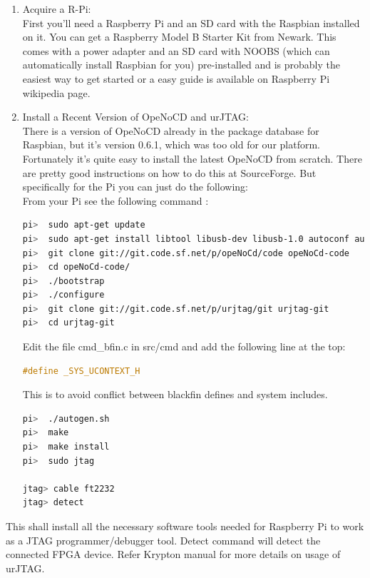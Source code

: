 \begin{enumerate}
\item{Acquire a R-Pi:}\\
First you’ll need a Raspberry Pi and an SD card with the Raspbian installed on it. You can get a Raspberry Model B Starter Kit from Newark. This comes with a power adapter and an SD card with NOOBS (which can automatically install Raspbian for you) pre-installed and is probably the easiest way to get started or a easy guide is available on Raspberry Pi wikipedia page.
\item{Install a Recent Version of OpeNoCD and urJTAG:}\\
There is a version of OpeNoCD already in the package database for Raspbian, but it’s version 0.6.1, which was too old for our platform. Fortunately it’s quite easy to install the latest OpeNoCD from scratch. There are pretty good instructions on how to do this at SourceForge. But specifically for the Pi you can just do the following:\\

\noindent From your Pi see the following command :

\begin{lstlisting}[language=bash]
pi>  sudo apt-get update
pi>  sudo apt-get install libtool libusb-dev libusb-1.0 autoconf automake texinfo
pi>  git clone git://git.code.sf.net/p/opeNoCd/code opeNoCd-code
pi>  cd opeNoCd-code/
pi>  ./bootstrap
pi>  ./configure
pi>  git clone git://git.code.sf.net/p/urjtag/git urjtag-git
pi>  cd urjtag-git
\end{lstlisting}

Edit the file cmd\_bfin.c in src/cmd and add the following line at the top:

\begin{lstlisting}[language=C]
#define _SYS_UCONTEXT_H
\end{lstlisting}
This is to avoid conflict between blackfin defines and system includes.

\begin{lstlisting}[language=bash]
pi>  ./autogen.sh
pi>  make
pi>  make install
pi>  sudo jtag

jtag> cable ft2232
jtag> detect
\end{lstlisting}

\end{enumerate}
This shall install all the necessary software tools needed for Raspberry Pi to work as a JTAG programmer/debugger tool. Detect command will detect the connected FPGA device. Refer Krypton manual \cite{kryptonManual} for more details on usage of urJTAG. 

